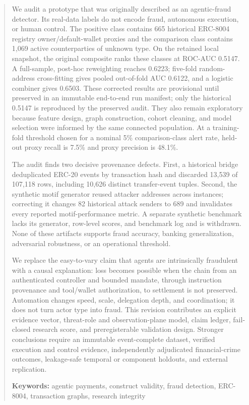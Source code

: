 \begin{abstract}
We audit a prototype that was originally described as an agentic-fraud
detector.  Its real-data labels do not encode fraud, autonomous execution, or
human control.  The positive class contains 665 historical ERC-8004 registry
owner/default-wallet proxies and the comparison class contains 1,069 active
counterparties of unknown type.  On the retained local snapshot, the original
composite ranks these classes at ROC-AUC 0.5147.  A full-sample, post-hoc
reweighting reaches 0.6223; five-fold random-address cross-fitting gives pooled
out-of-fold AUC 0.6122, and a logistic combiner gives 0.6503.  These corrected
results are provisional until preserved in an immutable end-to-end run
manifest; only the historical 0.5147 is reproduced by the preserved audit.
They also remain exploratory because feature design, graph construction, cohort
cleaning, and model selection were informed by the same connected population.
At a training-fold threshold chosen for a nominal 5\% comparison-class alert
rate, held-out proxy recall is 7.5\% and proxy precision is 48.1\%.

The audit finds two decisive provenance defects.  First, a historical bridge
deduplicated ERC-20 events by transaction hash and discarded 13,539 of 107,118
rows, including 10,626 distinct transfer-event tuples.  Second, the synthetic
motif generator reused attacker addresses across instances; correcting it
changes 82 historical attack senders to 689 and invalidates every reported
motif-performance metric.  A separate synthetic benchmark lacks its generator,
row-level scores, and benchmark log and is withdrawn.  None of these artifacts
supports fraud accuracy, banking generalization, adversarial robustness, or an
operational threshold.

We replace the easy-to-vary claim that agents are intrinsically fraudulent
with a causal explanation: loss becomes possible when the chain from an
authenticated controller and bounded mandate, through instruction provenance
and tool/wallet authorization, to settlement is not preserved.  Automation
changes speed, scale, delegation depth, and coordination; it does not turn
actor type into fraud.  This revision contributes an explicit evidence vector,
threat-role and observation-plane model, claim ledger, fail-closed research
score, and preregisterable validation design.  Stronger conclusions require an
immutable event-complete dataset, verified execution and control evidence,
independently adjudicated financial-crime outcomes, leakage-safe temporal or
component holdouts, and external replication.

\medskip
\noindent\textbf{Keywords:} agentic payments, construct validity, fraud
detection, ERC-8004, transaction graphs, research integrity
\end{abstract}
